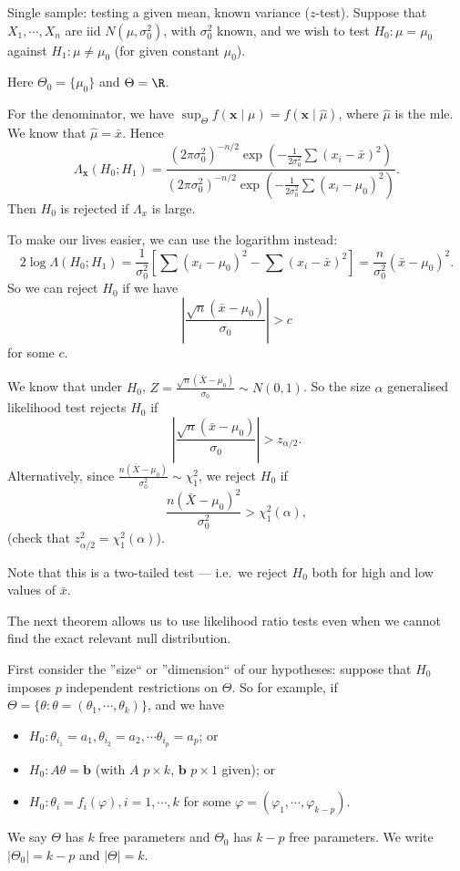 \documentclass[a4paper]{article}
\begin{document}
\begin{eg}
  Single sample: testing a given mean, known variance ($z$-test). Suppose that $X_1, \cdots, X_n$ are iid $N(\mu, \sigma_0^2)$, with $\sigma_0^2$ known, and we wish to test $H_0: \mu = \mu_0$ against $H_1: \mu \not= \mu_0$ (for given constant $\mu_0$).

  Here $\Theta_0 = \{\mu_0\}$ and $\Theta = \R$.

  For the denominator, we have $\sup_\Theta f(\mathbf{x}\mid \mu) = f(\mathbf{x}\mid \hat{\mu})$, where $\hat{\mu}$ is the mle. We know that $\hat{\mu} = \bar x$. Hence
  \[
    \Lambda_\mathbf{x}(H_0; H_1) = \frac{(2\pi\sigma_0^2)^{-n/2}\exp\left(-\frac{1}{2\sigma^2_0}\sum(x_i - \bar x)^2\right)}{(2\pi\sigma_0^2)^{-n/2}\exp\left(-\frac{1}{2\sigma^2_0}\sum(x_i - \mu_0)^2\right)}.
  \]
  Then $H_0$ is rejected if $\Lambda_x$ is large.

  To make our lives easier, we can use the logarithm instead:
  \[
    2\log \Lambda(H_0;H_1) = \frac{1}{\sigma_0^2}\left[\sum (x_i - \mu_0)^2 - \sum (x_i - \bar x)^2\right] = \frac{n}{\sigma_0^2}(\bar x - \mu_0)^2.
  \]
  So we can reject $H_0$ if we have
  \[
    \left|\frac{\sqrt{n}(\bar x - \mu_0)}{\sigma_0}\right| > c
  \]
  for some $c$.

  We know that under $H_0$, $\displaystyle Z = \frac{\sqrt{n}(\bar X - \mu_0)}{\sigma_0}\sim N(0, 1)$. So the size $\alpha$ generalised likelihood test rejects $H_0$ if
  \[
    \left|\frac{\sqrt{n}(\bar x - \mu_0)}{\sigma_0}\right| > z_{\alpha/2}.
  \]
  Alternatively, since $\displaystyle \frac{n(\bar X - \mu_0)}{\sigma_0^2}\sim \chi_1^2$, we reject $H_0$ if
  \[
    \frac{n(\bar X - \mu_0)^2}{\sigma_0^2} > \chi_1^2(\alpha),
  \]
  (check that $z_{\alpha/2}^2 = \chi_1^2(\alpha)$).

  Note that this is a two-tailed test --- i.e.\ we reject $H_0$ both for high and low values of $\bar x$.
\end{eg}

The next theorem allows us to use likelihood ratio tests even when we cannot find the exact relevant null distribution.

First consider the ''size`` or ''dimension`` of our hypotheses: suppose that $H_0$ imposes $p$ independent restrictions on $\Theta$. So for example, if $\Theta = \{\theta: \theta = (\theta_1, \cdots, \theta_k)\}$, and we have
\begin{itemize}
  \item $H_0: \theta_{i_1} = a_1, \theta_{i_2} = a_2, \cdots \theta_{i_p} = a_p$; or
  \item $H_0: A\theta = \mathbf{b}$ (with $A$ $p\times k$, $\mathbf{b}$ $p\times 1$ given); or
  \item $H_0: \theta_i = f_i(\varphi), i = 1, \cdots, k$ for some $\varphi = (\varphi_1, \cdots, \varphi_{k - p})$.
\end{itemize}
We say $\Theta$ has $k$ free parameters and $\Theta_0$ has $k - p$ free parameters. We write $|\Theta_0| = k - p$ and $|\Theta| = k$.
\end{document}
